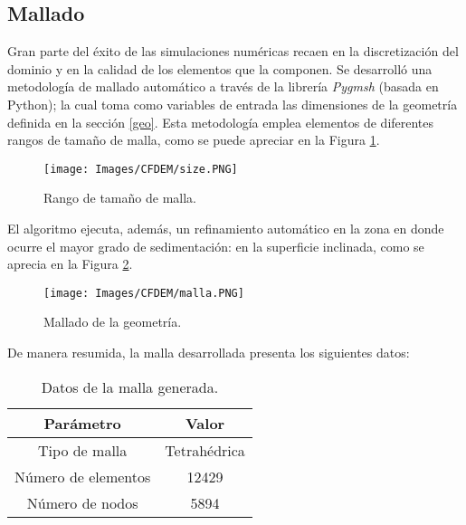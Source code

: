 \subsection{Mallado}

\noindent
\justify

Gran parte del \'exito de las simulaciones num\'ericas recaen en la discretizaci\'on del dominio y en la calidad de los elementos que la componen. Se desarroll\'o una metodolog\'ia de mallado autom\'atico a trav\'es de la librer\'ia \textit{Pygmsh} (basada en Python); la cual toma como variables de entrada las dimensiones de la geometr\'ia definida en la secci\'on \ref{geo}. Esta metodolog\'ia emplea elementos de diferentes rangos de tama\~no de malla, como se puede apreciar en la Figura \ref{rango}.

\begin{figure}[h!]
	\centering
	\texttt{[image: Images/CFDEM/size.PNG]}
	\caption{Rango de tama\~no de malla.}
	\label{rango}
\end{figure}

\noindent
\justify

El algoritmo ejecuta, adem\'as, un refinamiento autom\'atico en la zona en donde ocurre el mayor grado de sedimentaci\'on: en la superficie inclinada, como se aprecia en la Figura \ref{malla:geo}.

\begin{figure}[h!]
	\centering
	\texttt{[image: Images/CFDEM/malla.PNG]}
	\caption{Mallado de la geometr\'ia.}
	\label{malla:geo}
\end{figure}

\noindent
\justify

De manera resumida, la malla desarrollada presenta los siguientes datos:

\begin{table}[h!]
	\centering
	\begin{tabular}{|c|c|}
		\hline
		\textbf{Par\'ametro} & \textbf{Valor} \\ \hline
		Tipo de malla & Tetrah\'edrica \\ \hline
		N\'umero de elementos & 12429 \\ \hline
		N\'umero de nodos & 5894 \\ \hline	
	\end{tabular}
	\caption{Datos de la malla generada.}
	\label{malla}
\end{table}